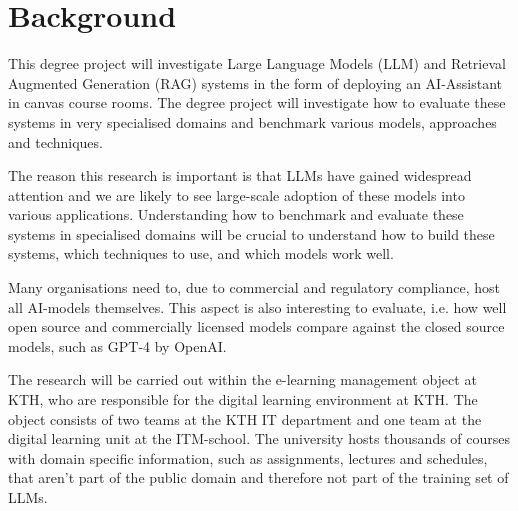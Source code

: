 



\section{Background}
\label{sec:background}


This degree project will investigate Large Language Models (\gls{LLM}) and Retrieval Augmented Generation (\gls{RAG}) systems in the form of deploying an AI-Assistant in canvas course rooms. The degree project will investigate how to evaluate these systems in very specialised domains and benchmark various models, approaches and techniques.

The reason this research is important is that \gls{LLM}s have gained widespread attention and we are likely to see large-scale adoption of these models into various applications. Understanding how to benchmark and evaluate these systems in specialised domains will be crucial to understand how to build these systems, which techniques to use, and which models work well.


Many organisations need to, due to commercial and regulatory compliance, host all AI-models themselves. This aspect is also interesting to evaluate, i.e. how well open source and commercially licensed models compare against the closed source models, such as GPT-4 by OpenAI.




The research will be carried out within the e-learning management object at KTH, who are responsible for the digital learning environment at KTH. The object consists of two teams at the KTH IT department and one team at the digital learning unit at the ITM-school. The university hosts thousands of courses with domain specific information, such as 
assignments, lectures and schedules, that aren’t part of the public domain and therefore not part of the training set of LLMs.


